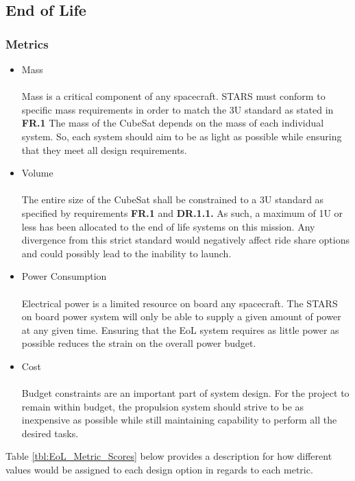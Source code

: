 
\subsection{End of Life}
\subsubsection{Metrics}
\begin{itemize}
\item Mass\\
\\
Mass is a critical component of any spacecraft. STARS must conform to specific mass requirements in order to match the 3U standard as stated in \textbf{FR.1} The mass of the CubeSat depends on the mass of each individual system. So, each system should aim to be as light as possible while ensuring that they meet all design requirements.
\\
\item{Volume} \\
\\
The entire size of the CubeSat shall be constrained to a 3U standard as specified by requirements \textbf{FR.1}  and  \textbf{DR.1.1.}  As such, a maximum of 1U or less has been allocated to the end of life systems on this mission. Any divergence from this strict standard would negatively affect ride share options and could possibly lead to the inability to launch.
\\
\item{Power Consumption} \\
\\
Electrical power is a limited resource on board any spacecraft. The STARS on board power system will only be able to supply a given amount of power at any given time. Ensuring that the EoL system requires as little power as possible reduces the strain on the overall power budget.
\\
\item{Cost} \\
\\
Budget constraints are an important part of system design. For the project to remain within budget, the propulsion system should strive to be as inexpensive as possible while still maintaining capability to perform all the desired tasks.  
\end{itemize}

Table \ref{tbl:EoL_Metric_Scores} below provides a description for how different values would be assigned to each design option in regards to each metric. 


